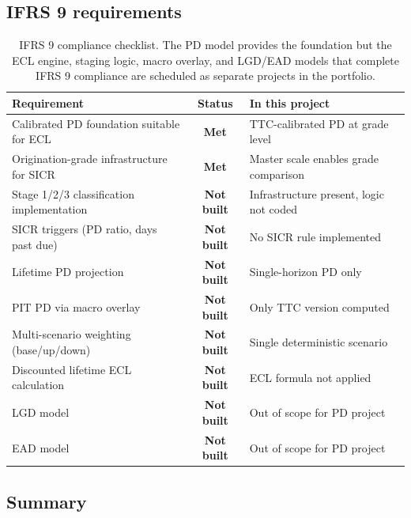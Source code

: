 \documentclass[a4paper,11pt]{article}
\begin{document}
\subsection{IFRS 9 requirements}

\begin{table}[H]
\centering
\footnotesize
\begin{tabular}{l c l}
\toprule
\textbf{Requirement} & \textbf{Status} & \textbf{In this project} \\
\midrule
Calibrated PD foundation suitable for ECL & \textcolor{goodgreen}{\textbf{Met}} & TTC-calibrated PD at grade level \\
Origination-grade infrastructure for SICR & \textcolor{goodgreen}{\textbf{Met}} & Master scale enables grade comparison \\
\midrule
Stage 1/2/3 classification implementation & \textcolor{missingred}{\textbf{Not built}} & Infrastructure present, logic not coded \\
SICR triggers (PD ratio, days past due) & \textcolor{missingred}{\textbf{Not built}} & No SICR rule implemented \\
Lifetime PD projection & \textcolor{missingred}{\textbf{Not built}} & Single-horizon PD only \\
PIT PD via macro overlay & \textcolor{missingred}{\textbf{Not built}} & Only TTC version computed \\
Multi-scenario weighting (base/up/down) & \textcolor{missingred}{\textbf{Not built}} & Single deterministic scenario \\
Discounted lifetime ECL calculation & \textcolor{missingred}{\textbf{Not built}} & ECL formula not applied \\
LGD model & \textcolor{missingred}{\textbf{Not built}} & Out of scope for PD project \\
EAD model & \textcolor{missingred}{\textbf{Not built}} & Out of scope for PD project \\
\bottomrule
\end{tabular}
\caption{IFRS 9 compliance checklist. The PD model provides the foundation but the ECL engine, staging logic, macro overlay, and LGD/EAD models that complete IFRS 9 compliance are scheduled as separate projects in the portfolio.}
\end{table}

\subsection{Summary}
\end{document}
